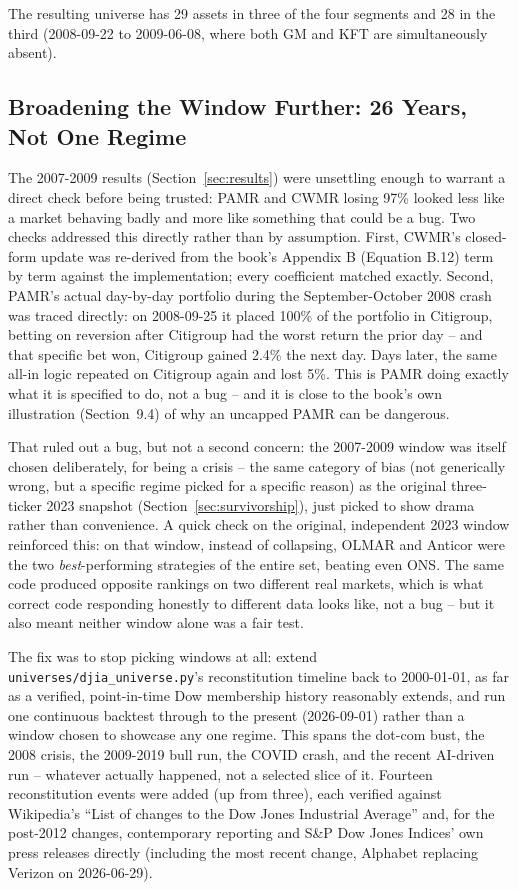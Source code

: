 \documentclass[11pt]{article}
\begin{document}
The resulting universe has 29 assets in three of the four segments and
28 in the third (2008-09-22 to 2009-06-08, where both GM and KFT are
simultaneously absent).

\subsection{Broadening the Window Further: 26 Years, Not One Regime}
\label{sec:broaden}

The 2007-2009 results (Section~\ref{sec:results}) were unsettling enough
to warrant a direct check before being trusted: PAMR and CWMR losing
97\% looked less like a market behaving badly and more like something
that could be a bug. Two checks addressed this directly rather than by
assumption. First, CWMR's closed-form update was re-derived from the
book's Appendix B (Equation B.12) term by term against the
implementation; every coefficient matched exactly. Second, PAMR's
actual day-by-day portfolio during the September-October 2008 crash was
traced directly: on 2008-09-25 it placed 100\% of the portfolio in
Citigroup, betting on reversion after Citigroup had the worst return
the prior day -- and that specific bet won, Citigroup gained 2.4\% the
next day. Days later, the same all-in logic repeated on Citigroup again
and lost 5\%. This is PAMR doing exactly what it is specified to do,
not a bug -- and it is close to the book's own illustration (Section~9.4)
of why an uncapped PAMR can be dangerous.

That ruled out a bug, but not a second concern: the 2007-2009 window
was itself chosen deliberately, for being a crisis -- the same category
of bias (not generically wrong, but a specific regime picked for a
specific reason) as the original three-ticker 2023 snapshot
(Section~\ref{sec:survivorship}), just picked to show drama rather than
convenience. A quick check on the original, independent 2023 window
reinforced this: on that window, instead of collapsing, OLMAR and
Anticor were the two \emph{best}-performing strategies of the entire
set, beating even ONS. The same code produced opposite rankings on two
different real markets, which is what correct code responding honestly
to different data looks like, not a bug -- but it also meant neither
window alone was a fair test.

The fix was to stop picking windows at all: extend
\texttt{universes/djia\_universe.py}'s reconstitution timeline back to
2000-01-01, as far as a verified, point-in-time Dow membership history
reasonably extends, and run one continuous backtest through to the
present (2026-09-01) rather than a window chosen to showcase any one
regime. This spans the dot-com bust, the 2008 crisis, the 2009-2019
bull run, the COVID crash, and the recent AI-driven run -- whatever
actually happened, not a selected slice of it. Fourteen reconstitution
events were added (up from three), each verified against Wikipedia's
``List of changes to the Dow Jones Industrial Average'' and, for the
post-2012 changes, contemporary reporting and S\&P Dow Jones Indices'
own press releases directly (including the most recent change, Alphabet
replacing Verizon on 2026-06-29).
\end{document}
